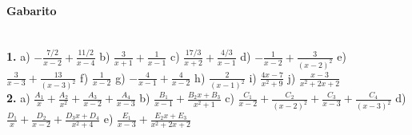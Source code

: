 \documentclass[a4paper,12pt]{article}
\begin{document}
\vspace*{\fill}
{\footnotesize\color{darkgray}
\paragraph*{Gabarito} \hspace*{\fill}\\
\textbf{1.}
a) $- \frac{7/2}{ x - 2} + \frac{11/2}{x - 4}$
b) $\frac{3}{x + 1} + \frac{1}{x - 1}$
c) $\frac{17/3}{x + 2} + \frac{4/3}{x - 1}$
d) $- \frac{1}{x - 2} + \frac{3}{\left(x - 2\right)^{2}}$
e) $\frac{3}{x - 3} + \frac{13}{\left(x - 3\right)^{2}}$
f) $\frac{1}{x - 2}$
g) $- \frac{4}{x - 1} + \frac{4}{x - 2}$
h) $\frac{2}{\left(x - 1\right)^{2}}$
i) $\frac{4 x - 7}{x^{2} + 9}$
j) $\frac{x - 3}{x^2+2x+2}$\\[2ex]
\textbf{2.}
a) $ \frac{A_1}{x} + \frac{A_2}{x^2} + \frac{A_3}{x-2} + \frac{A_4}{x-3}$
b) $ \frac{B_1}{x-1} + \frac{B_2x+B_3}{x^2+1}$
c) $  \frac{C_1}{x-2} + \frac{C_2}{(x-2)^2} + \frac{C_3}{x-3} + \frac{C_4}{(x-3)^2}$
d) $ \frac{D_1}{x} + \frac{D_2}{x-2} + \frac{D_3x+D_4}{x^2+4}$
e) $ \frac{E_1}{x-3} + \frac{E_2x+E_3}{x^2+2x+2}$
 }
\end{document}
